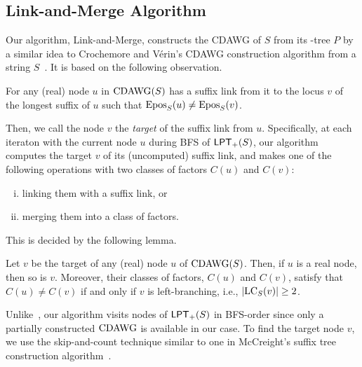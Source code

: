\subsection{Link-and-Merge Algorithm}
\label{sec:algo:link:merge}

Our algorithm, \textsf{Link-and-Merge}, constructs the CDAWG of $S$ from its \LPTrm-tree $P$
by a similar idea to Crochemore and V\'erin's CDAWG construction algorithm from a string $S$~\cite{crochemore:verin1997direct}. 
It is based on the following observation. 

\begin{lemma}
For any (real) node $u$ in $\mathrm{CDAWG}(S)$ has a suffix link from it to the locus $v$ of the longest suffix  of $u$ such that $\mathrm{Epos}_{S}(u) \not= \mathrm{Epos}_{S}(v)$.
\end{lemma}

Then, we call the node $v$ the \textit{target} of the suffix link from $u$. 
Specifically, at each iteraton with the current node $u$ during BFS of $\mathsf{LPT}_{+}(S)$, our algorithm computes the target $v$ of its (uncomputed) suffix link, and makes one of the following operations with two classes of factors $C(u)$ and $C(v)$:
\begin{enumerate}[(i)]
\item linking them with a suffix link, or
\item merging them into a class of factors.
\end{enumerate}

This is decided by the following lemma. 

\begin{lemma}
  Let $v$ be the target of any (real) node $u$ of $\mathrm{CDAWG}(S)$. Then, if $u$ is a real node, then so is $v$. Moreover, their classes of factors, $C(u)$ and $C(v)$, satisfy that $C(u) \not= C(v)$ if and only if $v$ is left-branching, i.e., $|\mathrm{LC}_{S}(v)|\ge 2$. 
\end{lemma}

Unlike~\cite{crochemore:verin1997direct}, our algorithm visits nodes of $\mathsf{LPT}_{+}(S)$ in BFS-order since only a partially constructed $\mathrm{CDAWG}$ is available in our case. To find the target node $v$, we use the skip-and-count technique similar to one in McCreight's suffix tree construction algorithm~\cite{mccreight1976space}.

